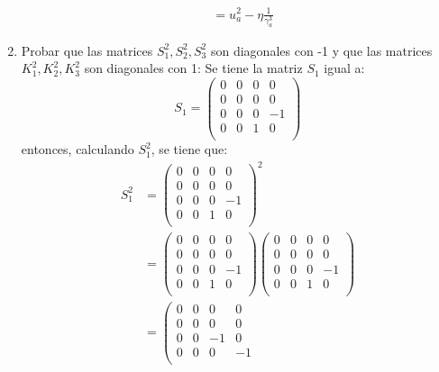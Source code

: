 \documentclass[12pt,letterpaper]{report}
\begin{document}
\begin{enumerate}
\begin{align*}
        & = u_a^2 - \eta \frac{1}{\gamma^3_a}
    \end{align*}
    \item Probar que las matrices $S_1^2,S_2^2,S_3^2$ son diagonales con -1 y que las matrices $K_1^2,K_2^2,K_3^2$ son diagonales con 1:
    Se tiene la matriz $S_1$ igual a:
    \begin{equation*}
        S_1 =\left( \begin{matrix}
            0 & 0 & 0 & 0 \\
            0 & 0 & 0 & 0 \\
            0 & 0 & 0 & -1 \\
            0 & 0 & 1 & 0 \\
        \end{matrix}\right)
    \end{equation*}
    entonces, calculando $S_1^2$, se tiene que:
    \begin{align*}
        S_1^2 &=\left( \begin{matrix}
            0 & 0 & 0 & 0 \\
            0 & 0 & 0 & 0 \\
            0 & 0 & 0 & -1 \\
            0 & 0 & 1 & 0 \\
        \end{matrix}\right)^2 \\
        & =\left( \begin{matrix}
            0 & 0 & 0 & 0 \\
            0 & 0 & 0 & 0 \\
            0 & 0 & 0 & -1 \\
            0 & 0 & 1 & 0 \\
        \end{matrix}\right)\left( \begin{matrix}
            0 & 0 & 0 & 0 \\
            0 & 0 & 0 & 0 \\
            0 & 0 & 0 & -1 \\
            0 & 0 & 1 & 0 \\
        \end{matrix}\right)\\
        & =\left( \begin{matrix}
            0 & 0 & 0 & 0 \\
            0 & 0 & 0 & 0 \\
            0 & 0 & -1 & 0 \\
            0 & 0 & 0 & -1 \\

\end{matrix}
\end{align*}
\end{enumerate}
\end{document}
